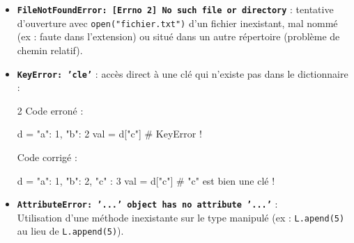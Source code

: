 \documentclass[11pt,a4paper]{article}
\begin{document}
\begin{tcolorbox}[left=0cm,title=\bf{\faBug \; 7. Fichiers, dictionnaires et attributs (KeyError, AttributeError)},colbacktitle=cfond]
\begin{itemize}
	\item[\textbullet] \textbf{\texttt{FileNotFoundError: [Errno 2] No such file or directory}} : tentative d'ouverture avec \texttt{open("fichier.txt")} d'un fichier inexistant, mal nommé (ex : faute dans l'extension) ou situé dans un autre répertoire (problème de chemin relatif).

	\item[\textbullet] \textbf{\texttt{KeyError: 'cle'}} : accès direct à une clé qui n'existe pas dans le dictionnaire :
	\setlength{\multicolsep}{0pt}
	\begin{multicols}{2}
		\textcolor{BrickRed}{\faTimesCircle \; Code erroné :}
		\begin{python}
d = {"a": 1, "b": 2}
val = d["c"] # KeyError !
		\end{python}
		\textcolor{OliveGreen}{\faCheckCircle \; Code corrigé :}
		\begin{python}
d = {"a": 1, "b": 2, "c" : 3}
val = d["c"] # "c" est bien une clé !
		\end{python}
	\end{multicols}

	\item[\textbullet] \textbf{\texttt{AttributeError: '...' object has no attribute '...'}} :\\
	Utilisation d'une méthode inexistante sur le type manipulé (ex : \texttt{L.apend(5)} au lieu de \texttt{L.append(5)}).
\end{itemize}
\end{tcolorbox}
\end{document}
